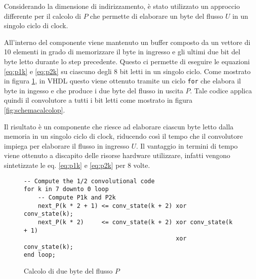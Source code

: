 Considerando la dimensione di indirizzamento, è stato utilizzato un approccio differente per il calcolo di $P$ che permette di elaborare un byte del flusso $U$ in un singolo ciclo di clock.

All'interno del componente viene mantenuto un buffer composto da un vettore di 10 elementi in grado di memorizzare il byte in ingresso e gli ultimi due bit del byte letto durante lo step precedente. Questo ci permette di eseguire le equazioni \ref{eq:p1k} e \ref{eq:p2k} su ciascuno degli 8 bit letti in un singolo ciclo. Come mostrato in figura \ref{code:calcolop}, in VHDL questo viene ottenuto tramite un ciclo \verb|for| che elabora il byte in ingesso e che produce i due byte del flusso in uscita $P$. Tale codice applica quindi il convolutore a tutti i bit letti come mostrato in figura \ref{fig:schemacalcolop}.

Il risultato è un componente che riesce ad elaborare ciascun byte letto dalla memoria in un singolo ciclo di clock, riducendo così il tempo che il convolutore impiega per elaborare il flusso in ingresso $U$. Il vantaggio in termini di tempo viene ottenuto a discapito delle risorse hardware utilizzare, infatti vengono sintetizzate le eq. \ref{eq:p1k} e \ref{eq:p2k} per 8 volte.

\begin{figure}[!ht]
    \centering
    \begin{varwidth}{\linewidth}
        \begin{verbatim}
-- Compute the 1/2 convolutional code
for k in 7 downto 0 loop
    -- Compute P1k and P2k
    next_P(k * 2 + 1) <= conv_state(k + 2) xor conv_state(k);
    next_P(k * 2)     <= conv_state(k + 2) xor conv_state(k + 1)
                                           xor conv_state(k);
end loop;
    \end{verbatim}
    \end{varwidth}
    \caption{Calcolo di due byte del flusso $P$}
    \label{code:calcolop}
\end{figure}

